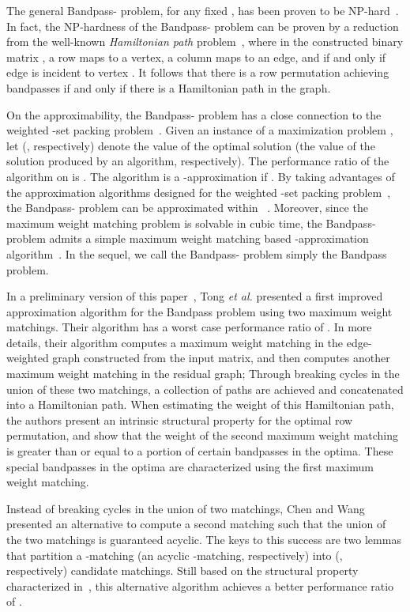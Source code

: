 \documentclass[11pt,twoside]{article}\usepackage{amssymb,latexsym,graphicx,hyperref}\usepackage{epstopdf}
\begin{document}
The general Bandpass- problem, for any fixed , has been proven to be NP-hard~\cite{Lin11}.
In fact, the NP-hardness of the Bandpass- problem can be proven by a reduction from the well-known {\em Hamiltonian path} problem~\cite{GJ79},
where in the constructed binary matrix , a row maps to a vertex, a column maps to an edge,
and  if and only if edge  is incident to vertex .
It follows that there is a row permutation achieving  bandpasses if and only if there is a Hamiltonian path in the graph.


On the approximability, the Bandpass- problem has a close connection to the weighted -set packing problem~\cite{GJ79}.
Given an instance  of a maximization problem ,
let  (, respectively) denote the value of the optimal solution (the value of the solution produced by an algorithm, respectively).
The performance ratio of the algorithm on  is .
The algorithm is a -approximation if .
By taking advantages of the approximation algorithms designed for the weighted -set packing problem~\cite{AH98,CH99},
the Bandpass- problem can be approximated within ~\cite{Lin11}.
Moreover, since the maximum weight matching problem is solvable in cubic time,
the Bandpass- problem admits a simple maximum weight matching based -approximation algorithm~\cite{Lin11}.
In the sequel, we call the Bandpass- problem simply the Bandpass problem.


In a preliminary version of this paper~\cite{TGD12},
Tong {\it et al.} presented a first improved approximation algorithm for the Bandpass problem using two maximum weight matchings.
Their algorithm has a worst case performance ratio of .
In more details, their algorithm computes a maximum weight matching in the edge-weighted graph constructed from the input matrix,
and then computes another maximum weight matching in the residual graph;
Through breaking cycles in the union of these two matchings, a collection of paths are achieved and concatenated into a Hamiltonian path.
When estimating the weight of this Hamiltonian path, the authors present an intrinsic structural property for the optimal row permutation,
and show that the weight of the second maximum weight matching is greater than or equal to a portion of certain bandpasses in the optima.
These special bandpasses in the optima are characterized using the first maximum weight matching.

Instead of breaking cycles in the union of two matchings,
Chen and Wang~\cite{CW12} presented an alternative to compute a second matching such that the union of the two matchings is guaranteed acyclic.
The keys to this success are two lemmas that partition a -matching (an acyclic -matching, respectively)
into  (, respectively) candidate matchings.
Still based on the structural property characterized in~\cite{TGD12},
this alternative algorithm achieves a better performance ratio of .
\end{document}
